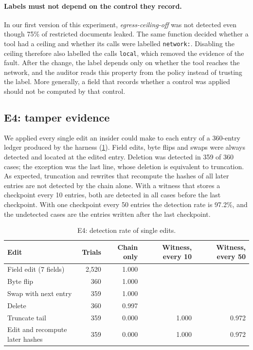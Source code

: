 \paragraph{Labels must not depend on the control they record.} In our first version of this
experiment, \emph{egress-ceiling-off} was not detected even though 75\% of restricted
documents leaked. The same function decided whether a tool had a ceiling and whether its calls
were labelled \texttt{network:}. Disabling the ceiling therefore also labelled the calls
\texttt{local}, which removed the evidence of the fault. After the change, the label depends
only on whether the tool reaches the network, and the auditor reads this property from the
policy instead of trusting the label. More generally, a field that records whether a control
was applied should not be computed by that control.

\subsection{E4: tamper evidence}
\label{sec:eval-tamper}

We applied every single edit an insider could make to each entry of a 360-entry ledger produced
by the harness (\cref{tab:tamper}). Field edits, byte flips and swaps were always detected and
located at the edited entry. Deletion was detected in 359 of 360 cases; the exception was the
last line, whose deletion is equivalent to truncation. As expected, truncation and rewrites that
recompute the hashes of all later entries are not detected by the chain alone. With a witness
that stores a checkpoint every 10 entries, both are detected in all cases before the last
checkpoint. With one checkpoint every 50 entries the detection rate is 97.2\%, and the
undetected cases are the entries written after the last checkpoint.

\begin{table}[t]
\centering\small
\begin{tabular}{@{}l r r r r@{}}
\toprule
Edit & Trials & Chain only & Witness, every 10 & Witness, every 50 \\
\midrule
Field edit (7 fields) & 2{,}520 & 1.000 & & \\
Byte flip & 360 & 1.000 & & \\
Swap with next entry & 359 & 1.000 & & \\
Delete & 360 & 0.997 & & \\
Truncate tail & 359 & 0.000 & 1.000 & 0.972 \\
Edit and recompute later hashes & 359 & 0.000 & 1.000 & 0.972 \\
\bottomrule
\end{tabular}
\caption{E4: detection rate of single edits.}
\label{tab:tamper}
\end{table}

